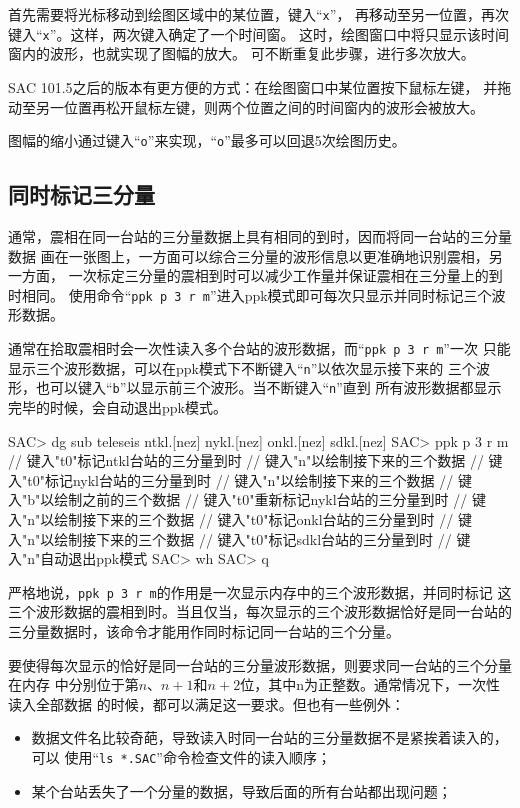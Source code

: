 首先需要将光标移动到绘图区域中的某位置，键入``\verb+x+''，
再移动至另一位置，再次键入``\verb+x+''。这样，两次键入确定了一个时间窗。
这时，绘图窗口中将只显示该时间窗内的波形，也就实现了图幅的放大。
可不断重复此步骤，进行多次放大。

SAC 101.5之后的版本有更方便的方式：在绘图窗口中某位置按下鼠标左键，
并拖动至另一位置再松开鼠标左键，则两个位置之间的时间窗内的波形会被放大。

图幅的缩小通过键入``\verb+o+''来实现，``\verb+o+''最多可以回退5次绘图历史。

\subsection{同时标记三分量}
通常，震相在同一台站的三分量数据上具有相同的到时，因而将同一台站的三分量数据
画在一张图上，一方面可以综合三分量的波形信息以更准确地识别震相，另一方面，
一次标定三分量的震相到时可以减少工作量并保证震相在三分量上的到时相同。
使用命令``\verb+ppk p 3 r m+''进入ppk模式即可每次只显示并同时标记三个波形数据。

通常在拾取震相时会一次性读入多个台站的波形数据，而``\verb+ppk p 3 r m+''一次
只能显示三个波形数据，可以在ppk模式下不断键入``\verb+n+''以依次显示接下来的
三个波形，也可以键入``\verb+b+''以显示前三个波形。当不断键入``\verb+n+''直到
所有波形数据都显示完毕的时候，会自动退出ppk模式。

\begin{SACCode}
SAC> dg sub teleseis ntkl.[nez] nykl.[nez] onkl.[nez] sdkl.[nez]
SAC> ppk p 3 r m
// 键入"t0"标记ntkl台站的三分量到时
// 键入"n"以绘制接下来的三个数据
// 键入"t0"标记nykl台站的三分量到时
// 键入"n"以绘制接下来的三个数据
// 键入"b"以绘制之前的三个数据
// 键入"t0"重新标记nykl台站的三分量到时
// 键入"n"以绘制接下来的三个数据
// 键入"t0"标记onkl台站的三分量到时
// 键入"n"以绘制接下来的三个数据
// 键入"t0"标记sdkl台站的三分量到时
// 键入"n"自动退出ppk模式
SAC> wh
SAC> q
\end{SACCode}

严格地说，\verb+ppk p 3 r m+的作用是一次显示内存中的三个波形数据，并同时标记
这三个波形数据的震相到时。当且仅当，每次显示的三个波形数据恰好是同一台站的
三分量数据时，该命令才能用作同时标记同一台站的三个分量。

要使得每次显示的恰好是同一台站的三分量波形数据，则要求同一台站的三个分量在内存
中分别位于第$n$、$n+1$和$n+2$位，其中n为正整数。通常情况下，一次性读入全部数据
的时候，都可以满足这一要求。但也有一些例外：
\begin{itemize}
\item 数据文件名比较奇葩，导致读入时同一台站的三分量数据不是紧挨着读入的，可以
    使用``\verb+ls *.SAC+''命令检查文件的读入顺序；
\item 某个台站丢失了一个分量的数据，导致后面的所有台站都出现问题；
\end{itemize}

